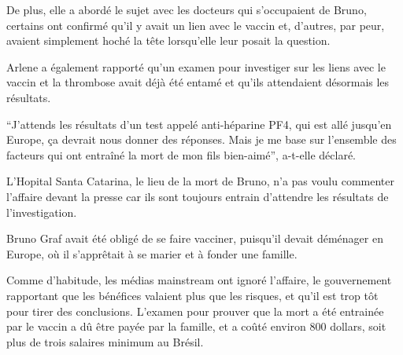{De plus, elle a abordé le sujet avec les docteurs qui s'occupaient de Bruno,
certains ont confirmé qu'il y avait un lien avec le vaccin et, d'autres, par
peur, avaient simplement hoché la tête lorsqu'elle leur posait la question.

Arlene a également rapporté qu'un examen pour investiger sur les liens avec le
vaccin et la thrombose avait déjà été entamé et qu'ils attendaient désormais les
résultats.

“J'attends les résultats d'un test appelé anti-héparine PF4, qui est allé
jusqu'en Europe, ça devrait nous donner des réponses. Mais je me base sur
l'ensemble des facteurs qui ont entraîné la mort de mon fils bien-aimé”,
a-t-elle déclaré.

L'Hopital Santa Catarina, le lieu de la mort de Bruno, n'a pas voulu commenter
l'affaire devant la presse car ils sont toujours entrain d'attendre les
résultats de l'investigation.

Bruno Graf avait été obligé de se faire vacciner, puisqu'il devait déménager en
Europe, où il s'apprêtait à se marier et à fonder une famille.

Comme d'habitude, les médias mainstream ont ignoré l'affaire, le gouvernement
rapportant que les bénéfices valaient plus que les risques, et qu'il est trop
tôt pour tirer des conclusions. L'examen pour prouver que la mort a été
entrainée par le vaccin a dû être payée par la famille, et a coûté environ 800
dollars, soit plus de trois salaires minimum au Brésil.

}
